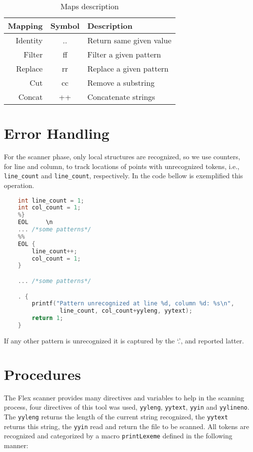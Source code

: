 \documentclass{article}
\begin{document}
\begin{table}[ht]
\centering
\caption{Maps description}
\label{tab:maps}
\begin{tabular}{|r|c|l|}
\hline
Mapping   & Symbol & Description\\ \hline
Identity  & ..     & Return same given value \\
Filter    & ff     & Filter a given pattern \\
Replace   & rr     & Replace a given pattern \\
Cut       & cc     & Remove a substring \\
Concat    & ++     & Concatenate strings \\
\hline
\end{tabular}
\end{table}

\section{Error Handling}
For the scanner phase, only local structures are recognized, so we use counters,
for line and column, to track locations of points with unrecognized tokens,
i.e., \texttt{line_count} and \texttt{line_count}, respectively. In the
code bellow is exemplified this operation.

\begin{lstlisting}[language=C, caption=Example of code monitoring lines and columns.]
    %{
    int line_count = 1;
    int col_count = 1;
    %}
    EOL     \n
    ... /*some patterns*/
    %%
    EOL {
        line_count++;
        col_count = 1;
    }

    ... /*some patterns*/

    . {
        printf("Pattern unrecognized at line %d, column %d: %s\n",
                line_count, col_count+yyleng, yytext);
        return 1;
    }
\end{lstlisting}

If any other pattern is unrecognized it is captured by the `.', and reported
latter.

\section{Procedures}
The Flex scanner provides many directives and variables to help in the scanning
process, four directives of this tool was used, \texttt{yyleng},
\texttt{yytext}, \texttt{yyin} and \texttt{yylineno}. The \texttt{yyleng}
returns the length of the current string recognized, the \texttt{yytext}
returns this string, the \texttt{yyin} read and return the file to be scanned.
All tokens are recognized and categorized by a macro \texttt{printLexeme}
defined in the following manner:
\end{document}
